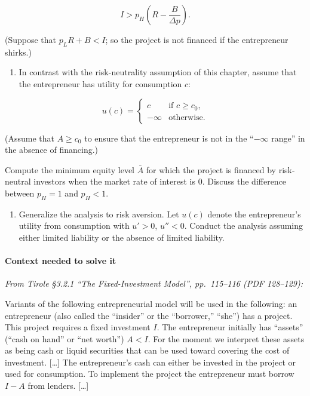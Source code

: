 \documentclass[11pt,a4paper]{article}
\providecommand{\tightlist}{\setlength{\itemsep}{0pt}\setlength{\parskip}{0pt}}
\begin{document}
\[I > p_H\left(R - \frac{B}{\Delta p}\right).\]

(Suppose that \(p_L R + B < I\); so the project is not financed if the entrepreneur shirks.)

\begin{enumerate}
\def\labelenumi{(\roman{enumi})}
\tightlist
\item
  In contrast with the risk-neutrality assumption of this chapter, assume that the entrepreneur has
  utility for consumption \(c\):
\end{enumerate}

\[u(c) = \begin{cases} c & \text{if } c \geqslant c_0, \\ -\infty & \text{otherwise.} \end{cases}\]

(Assume that \(A \geqslant c_0\) to ensure that the entrepreneur is not in the ``\(-\infty\) range''
in the absence of financing.)

Compute the minimum equity level \(\bar A\) for which the project is financed by risk-neutral
investors when the market rate of interest is 0. Discuss the difference between \(p_H = 1\) and
\(p_H < 1\).

\begin{enumerate}
\def\labelenumi{(\roman{enumi})}
\setcounter{enumi}{1}
\tightlist
\item
  Generalize the analysis to risk aversion. Let \(u(c)\) denote the entrepreneur's utility from
  consumption with \(u' > 0\), \(u'' < 0\). Conduct the analysis assuming either limited liability
  or the absence of limited liability.
\end{enumerate}

\paragraph{Context needed to solve it}

\emph{From Tirole §3.2.1 ``The Fixed-Investment Model'', pp.~115--116 (PDF 128--129):}

Variants of the following entrepreneurial model will be used in the following: an entrepreneur (also
called the ``insider'' or the ``borrower,'' ``she'') has a project. This project requires a fixed
investment \(I\). The entrepreneur initially has ``assets'' (``cash on hand'' or ``net worth'')
\(A < I\). For the moment we interpret these assets as being cash or liquid securities that can be
used toward covering the cost of investment. {[}\ldots{]} The entrepreneur's cash can either be
invested in the project or used for consumption. To implement the project the entrepreneur must
borrow \(I - A\) from lenders. {[}\ldots{]}
\end{document}
